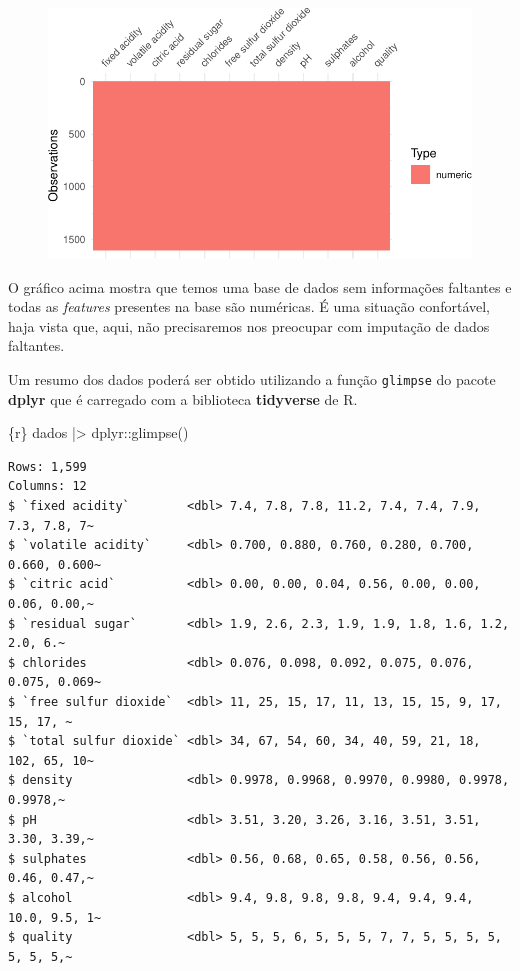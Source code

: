 \documentclass[
  letterpaper,
  DIV=11,
  numbers=noendperiod,
  oneside]{scrartcl}
\newenvironment{Shaded}{\begin{snugshade}}{\end{snugshade}}
\newcommand{\FunctionTok}[1]{\textcolor[rgb]{0.28,0.35,0.67}{#1}}
\newcommand{\InformationTok}[1]{\textcolor[rgb]{0.37,0.37,0.37}{#1}}
\newcommand{\NormalTok}[1]{\textcolor[rgb]{0.00,0.23,0.31}{#1}}
\newcommand{\SpecialCharTok}[1]{\textcolor[rgb]{0.37,0.37,0.37}{#1}}
\begin{document}
\begin{figure}[H]

{\centering \includegraphics{tufte_svm_regressao_files/figure-pdf/unnamed-chunk-3-1.pdf}

}

\end{figure}

O gráfico acima mostra que temos uma base de dados sem informações
faltantes e todas as \emph{features} presentes na base são numéricas. É
uma situação confortável, haja vista que, aqui, não precisaremos nos
preocupar com imputação de dados faltantes.

Um resumo dos dados poderá ser obtido utilizando a função
\texttt{glimpse} do pacote \textbf{dplyr} que é carregado com a
biblioteca \textbf{tidyverse} de R.

\begin{Shaded}
\begin{Highlighting}[]
\InformationTok{\textasciigrave{}\textasciigrave{}\textasciigrave{}\{r\}}
\NormalTok{dados }\SpecialCharTok{|\textgreater{}} 
\NormalTok{  dplyr}\SpecialCharTok{::}\FunctionTok{glimpse}\NormalTok{()}
\InformationTok{\textasciigrave{}\textasciigrave{}\textasciigrave{}}
\end{Highlighting}
\end{Shaded}

\begin{verbatim}
Rows: 1,599
Columns: 12
$ `fixed acidity`        <dbl> 7.4, 7.8, 7.8, 11.2, 7.4, 7.4, 7.9, 7.3, 7.8, 7~
$ `volatile acidity`     <dbl> 0.700, 0.880, 0.760, 0.280, 0.700, 0.660, 0.600~
$ `citric acid`          <dbl> 0.00, 0.00, 0.04, 0.56, 0.00, 0.00, 0.06, 0.00,~
$ `residual sugar`       <dbl> 1.9, 2.6, 2.3, 1.9, 1.9, 1.8, 1.6, 1.2, 2.0, 6.~
$ chlorides              <dbl> 0.076, 0.098, 0.092, 0.075, 0.076, 0.075, 0.069~
$ `free sulfur dioxide`  <dbl> 11, 25, 15, 17, 11, 13, 15, 15, 9, 17, 15, 17, ~
$ `total sulfur dioxide` <dbl> 34, 67, 54, 60, 34, 40, 59, 21, 18, 102, 65, 10~
$ density                <dbl> 0.9978, 0.9968, 0.9970, 0.9980, 0.9978, 0.9978,~
$ pH                     <dbl> 3.51, 3.20, 3.26, 3.16, 3.51, 3.51, 3.30, 3.39,~
$ sulphates              <dbl> 0.56, 0.68, 0.65, 0.58, 0.56, 0.56, 0.46, 0.47,~
$ alcohol                <dbl> 9.4, 9.8, 9.8, 9.8, 9.4, 9.4, 9.4, 10.0, 9.5, 1~
$ quality                <dbl> 5, 5, 5, 6, 5, 5, 5, 7, 7, 5, 5, 5, 5, 5, 5, 5,~
\end{verbatim}
\end{document}
